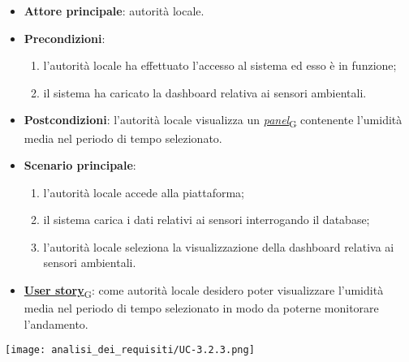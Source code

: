 \begin{itemize}
	\item \textbf{Attore principale}: autorità locale.
	\item \textbf{Precondizioni}:
	      \begin{enumerate}
		      \item l'autorità locale ha effettuato l'accesso al sistema ed esso è in funzione;
		      \item il sistema ha caricato la dashboard relativa ai sensori ambientali.
	      \end{enumerate}
	\item \textbf{Postcondizioni}: l'autorità locale visualizza un \href{https://7last.github.io/docs/pb/documentazione-interna/glossario\#panel}{\textit{panel}\textsubscript{G}} contenente l'umidità media nel periodo di tempo selezionato.
	\item \textbf{Scenario principale}:
	      \begin{enumerate}
		      \item l'autorità locale accede alla piattaforma;
		      \item il sistema carica i dati relativi ai sensori interrogando il database;
		      \item l'autorità locale seleziona la visualizzazione della dashboard relativa ai sensori ambientali.
	      \end{enumerate}
	\item \href{https://7last.github.io/docs/pb/documentazione-interna/glossario\#user-story}{\textbf{User story}\textsubscript{G}}: come autorità locale desidero poter visualizzare l'umidità media nel periodo di tempo selezionato
	      in modo da poterne monitorare l'andamento.
\end{itemize}
\begin{center}
	\texttt{[image: analisi\_dei\_requisiti/UC-3.2.3.png]}
\end{center}



